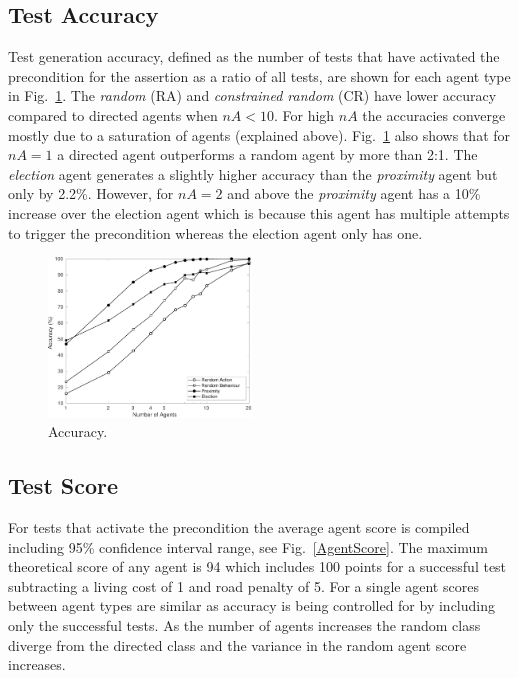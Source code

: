 \documentclass[letterpaper, 10 pt, journal, twoside]{IEEEtran}
\begin{document}
\subsection{Test Accuracy}
Test generation accuracy, defined as the number of tests that have activated the precondition for the assertion as a ratio of all tests, are shown for each agent type in Fig.~\ref{Accuracy}. The \textit{random} (RA) and \textit{constrained random} (CR) have lower accuracy compared to directed agents when $nA<10$. For high $nA$ the accuracies converge mostly due to a saturation of agents (explained above).
%
Fig.~\ref{Accuracy} also shows that for $nA=1$ a directed agent outperforms a random agent by more than 2:1. The \textit{election} agent generates a slightly higher accuracy than the \textit{proximity} agent but only by 2.2\%. However, for $nA=2$ and above the \textit{proximity} agent has a 10\% increase over the election agent which is because this agent has multiple attempts to trigger the precondition whereas the election agent only has one.


\begin{figure}[!t]
	\centering
\includegraphics[width=0.48\textwidth]{Accuracy.pdf}
	\caption{Accuracy.}
	\label{Accuracy}
\end{figure}



\subsection{Test Score} \label{testscore}
For tests that activate the precondition the average agent score is compiled including 95\% confidence interval range, see Fig.~\ref{AgentScore}. The maximum theoretical score of any agent is 94 which includes 100 points for a successful test subtracting a living cost of 1 and road penalty of 5. For a single agent scores between agent types are similar as accuracy is being controlled for by including only the successful tests. As the number of agents increases the random class diverge from the directed class and the variance in the random agent score increases. 
\end{document}
